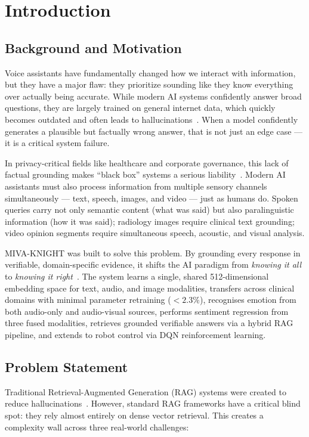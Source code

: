 \documentclass[12pt,a4paper]{article}
\theoremstyle{definition}
\theoremstyle{plain}
\theoremstyle{remark}
\begin{document}
\section{Introduction}

\subsection{Background and Motivation}

Voice assistants have fundamentally changed how we interact with information, but they have a major flaw: they prioritize sounding like they know everything over actually being accurate. While modern AI systems confidently answer broad questions, they are largely trained on general internet data, which quickly becomes outdated and often leads to hallucinations~\cite{lewis2020rag}. When a model confidently generates a plausible but factually wrong answer, that is not just an edge case --- it is a critical system failure.

In privacy-critical fields like healthcare and corporate governance, this lack of factual grounding makes ``black box'' systems a serious liability~\cite{pan2024unifying}. Modern AI assistants must also process information from multiple sensory channels simultaneously --- text, speech, images, and video --- just as humans do. Spoken queries carry not only semantic content (what was said) but also paralinguistic information (how it was said); radiology images require clinical text grounding; video opinion segments require simultaneous speech, acoustic, and visual analysis.

MIVA-KNIGHT was built to solve this problem. By grounding every response in verifiable, domain-specific evidence, it shifts the AI paradigm from \emph{knowing it all} to \emph{knowing it right}~\cite{sarmah2024hybridrag}. The system learns a single, shared 512-dimensional embedding space for text, audio, and image modalities, transfers across clinical domains with minimal parameter retraining ($< 2.3\%$), recognises emotion from both audio-only and audio-visual sources, performs sentiment regression from three fused modalities, retrieves grounded verifiable answers via a hybrid RAG pipeline, and extends to robot control via DQN reinforcement learning.

\subsection{Problem Statement}

Traditional Retrieval-Augmented Generation (RAG) systems were created to reduce hallucinations~\cite{lewis2020rag}. However, standard RAG frameworks have a critical blind spot: they rely almost entirely on dense vector retrieval. This creates a complexity wall across three real-world challenges:
\end{document}
